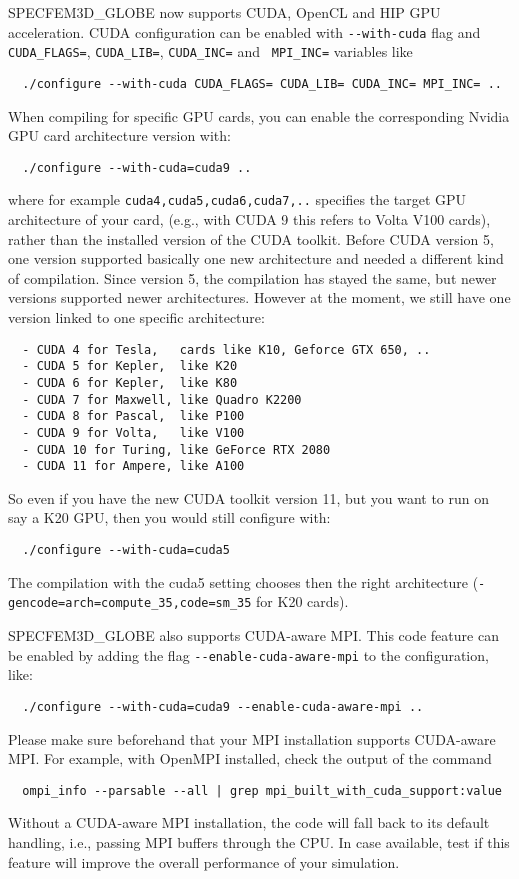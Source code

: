 \noindent
SPECFEM3D\_GLOBE now supports CUDA, OpenCL and HIP GPU acceleration.
CUDA configuration can be enabled with \texttt{-{}-with-cuda} flag and
\texttt{CUDA\_FLAGS=}, \texttt{CUDA\_LIB=}, \texttt{CUDA\_INC=}
and \texttt{ MPI\_INC=} variables like
{\small
\begin{verbatim}
  ./configure --with-cuda CUDA_FLAGS= CUDA_LIB= CUDA_INC= MPI_INC= ..
\end{verbatim}
}
\noindent
When compiling for specific GPU cards, you can enable the corresponding Nvidia GPU card architecture version with:
{\small
\begin{verbatim}
  ./configure --with-cuda=cuda9 ..
\end{verbatim}
}
\noindent
where for example \texttt{cuda4,cuda5,cuda6,cuda7,..} specifies the target GPU architecture of your card,
(e.g., with CUDA 9 this refers to Volta V100 cards), rather than the installed version of the CUDA toolkit.
Before CUDA version 5, one version supported basically one new architecture and needed a different kind of compilation.
Since version 5, the compilation has stayed the same, but newer versions supported newer architectures.
However at the moment, we still have one version linked to one specific architecture:
{\small
\begin{verbatim}
  - CUDA 4 for Tesla,   cards like K10, Geforce GTX 650, ..
  - CUDA 5 for Kepler,  like K20
  - CUDA 6 for Kepler,  like K80
  - CUDA 7 for Maxwell, like Quadro K2200
  - CUDA 8 for Pascal,  like P100
  - CUDA 9 for Volta,   like V100
  - CUDA 10 for Turing, like GeForce RTX 2080
  - CUDA 11 for Ampere, like A100
\end{verbatim}
}
\noindent
So even if you have the new CUDA toolkit version 11, but you want to run on say a K20 GPU, then you would still configure with:
{\small
\begin{verbatim}
  ./configure --with-cuda=cuda5
\end{verbatim}
}
\noindent
The compilation with the cuda5 setting chooses then the right architecture (\texttt{-gencode=arch=compute\_35,code=sm\_35} for K20 cards).\newline


SPECFEM3D\_GLOBE also supports CUDA-aware MPI. This code feature can be enabled by adding the flag \texttt{-{}-enable-cuda-aware-mpi} to
the configuration, like:
{\small
\begin{verbatim}
  ./configure --with-cuda=cuda9 --enable-cuda-aware-mpi ..
\end{verbatim}
}
\noindent
Please make sure beforehand that your MPI installation supports CUDA-aware MPI.
For example, with OpenMPI installed, check the output of the command
{\small
\begin{verbatim}
  ompi_info --parsable --all | grep mpi_built_with_cuda_support:value
\end{verbatim}
}
\noindent
Without a CUDA-aware MPI installation, the code will fall back to its default handling, i.e., passing MPI buffers through the CPU.
In case available, test if this feature will improve the overall performance of your simulation.\newline


